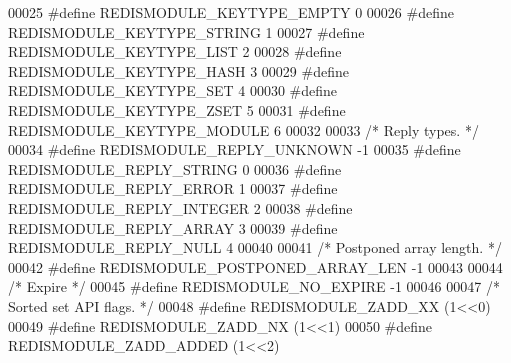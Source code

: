 \begin{DoxyCode}
00025 \textcolor{preprocessor}{#}\textcolor{preprocessor}{define} \textcolor{preprocessor}{REDISMODULE\_KEYTYPE\_EMPTY} 0
00026 \textcolor{preprocessor}{#}\textcolor{preprocessor}{define} \textcolor{preprocessor}{REDISMODULE\_KEYTYPE\_STRING} 1
00027 \textcolor{preprocessor}{#}\textcolor{preprocessor}{define} \textcolor{preprocessor}{REDISMODULE\_KEYTYPE\_LIST} 2
00028 \textcolor{preprocessor}{#}\textcolor{preprocessor}{define} \textcolor{preprocessor}{REDISMODULE\_KEYTYPE\_HASH} 3
00029 \textcolor{preprocessor}{#}\textcolor{preprocessor}{define} \textcolor{preprocessor}{REDISMODULE\_KEYTYPE\_SET} 4
00030 \textcolor{preprocessor}{#}\textcolor{preprocessor}{define} \textcolor{preprocessor}{REDISMODULE\_KEYTYPE\_ZSET} 5
00031 \textcolor{preprocessor}{#}\textcolor{preprocessor}{define} \textcolor{preprocessor}{REDISMODULE\_KEYTYPE\_MODULE} 6
00032 
00033 \textcolor{comment}{/* Reply types. */}
00034 \textcolor{preprocessor}{#}\textcolor{preprocessor}{define} \textcolor{preprocessor}{REDISMODULE\_REPLY\_UNKNOWN} \textcolor{preprocessor}{-}1
00035 \textcolor{preprocessor}{#}\textcolor{preprocessor}{define} \textcolor{preprocessor}{REDISMODULE\_REPLY\_STRING} 0
00036 \textcolor{preprocessor}{#}\textcolor{preprocessor}{define} \textcolor{preprocessor}{REDISMODULE\_REPLY\_ERROR} 1
00037 \textcolor{preprocessor}{#}\textcolor{preprocessor}{define} \textcolor{preprocessor}{REDISMODULE\_REPLY\_INTEGER} 2
00038 \textcolor{preprocessor}{#}\textcolor{preprocessor}{define} \textcolor{preprocessor}{REDISMODULE\_REPLY\_ARRAY} 3
00039 \textcolor{preprocessor}{#}\textcolor{preprocessor}{define} \textcolor{preprocessor}{REDISMODULE\_REPLY\_NULL} 4
00040 
00041 \textcolor{comment}{/* Postponed array length. */}
00042 \textcolor{preprocessor}{#}\textcolor{preprocessor}{define} \textcolor{preprocessor}{REDISMODULE\_POSTPONED\_ARRAY\_LEN} \textcolor{preprocessor}{-}1
00043 
00044 \textcolor{comment}{/* Expire */}
00045 \textcolor{preprocessor}{#}\textcolor{preprocessor}{define} \textcolor{preprocessor}{REDISMODULE\_NO\_EXPIRE} \textcolor{preprocessor}{-}1
00046 
00047 \textcolor{comment}{/* Sorted set API flags. */}
00048 \textcolor{preprocessor}{#}\textcolor{preprocessor}{define} \textcolor{preprocessor}{REDISMODULE\_ZADD\_XX}      \textcolor{preprocessor}{(}1\textcolor{preprocessor}{<<}0\textcolor{preprocessor}{)}
00049 \textcolor{preprocessor}{#}\textcolor{preprocessor}{define} \textcolor{preprocessor}{REDISMODULE\_ZADD\_NX}      \textcolor{preprocessor}{(}1\textcolor{preprocessor}{<<}1\textcolor{preprocessor}{)}
00050 \textcolor{preprocessor}{#}\textcolor{preprocessor}{define} \textcolor{preprocessor}{REDISMODULE\_ZADD\_ADDED}   \textcolor{preprocessor}{(}1\textcolor{preprocessor}{<<}2\textcolor{preprocessor}{)}

\end{DoxyCode}
